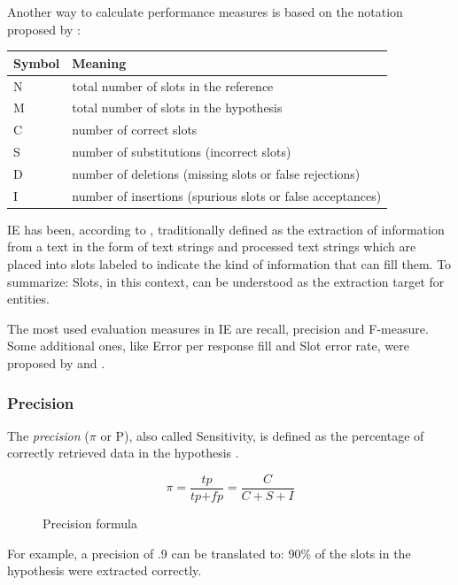 Another way to calculate performance measures is based on the notation proposed by \citeauthor{Makhoul:1999} \cite{Makhoul:1999}:

\begin{table}[H]
\centering
\begin{tabular*}{\textwidth}{ll}
	\toprule
	\textbf{Symbol} & \textbf{Meaning} \\
	\midrule
	N & total number of slots in the reference \\
	M & total number of slots in the hypothesis \\
	C & number of correct slots \\
	S & number of substitutions (incorrect slots) \\
	D & number of deletions (missing slots or false rejections) \\
	I & number of insertions (spurious slots or false acceptances) \\
	\bottomrule
\end{tabular*}
\end{table}

\gls{IE} has been, according to \cite{Chinchor:1998}, traditionally defined as the extraction of information from a text in the form of text strings and processed text strings which are placed into slots labeled to indicate the kind of information that can fill them. To summarize: Slots, in this context, can be understood as the extraction target for entities.

The most used evaluation measures in \gls{IE} are recall, precision and F-measure. Some additional ones, like Error per response fill and  Slot error rate, were proposed by \cite{Chinchor:1995} and \cite{Makhoul:1999}.

\subsubsection{Precision}
The \textit{precision} (\ensuremath{\pi} or P), also called Sensitivity, is defined as the percentage of correctly retrieved data in the hypothesis \cite{Carstensen:2010}. 

\begin{figure}[H]
\begin{displaymath}
	\pi = \frac{\textit{tp}}{\textit{tp} + \textit{fp}} = \frac{C}{C+S+I}
\end{displaymath}
\caption{Precision formula}
\end{figure}

For example, a precision of .9 can be translated to: 90\% of the slots in the hypothesis were extracted correctly.

